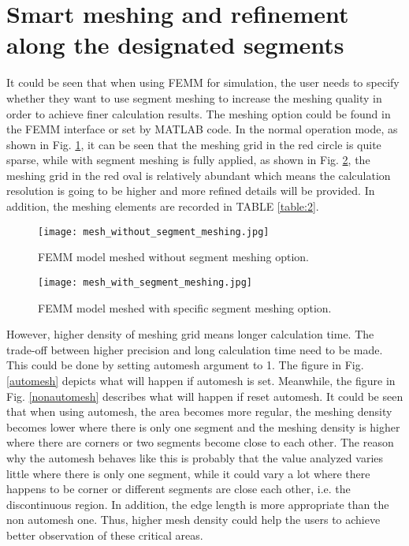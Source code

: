 \documentclass[a4paper]{IEEEtran}
\begin{document}
{\section{Smart meshing and refinement along the designated segments}
It could be seen that when using FEMM for simulation, the user needs to specify whether they want to use
segment meshing to increase the meshing quality in order to achieve finer calculation results.
The meshing option could be found in the FEMM interface or set by MATLAB code. In the normal operation mode, as shown in Fig. \ref{without meshing},
it can be seen that the meshing grid in the red circle is quite sparse, while with segment meshing is fully applied, as shown in Fig. \ref{with meshing},
the meshing grid in the red oval is relatively abundant which means the calculation resolution is going to be higher and more refined
details will be provided. In addition, the meshing elements are recorded in TABLE \ref{table:2}.
\begin{figure}[H]
\begin{centering}
\texttt{[image: mesh\_without\_segment\_meshing.jpg]} 
\par\end{centering}   
\caption{FEMM model meshed without segment meshing option.\label{without meshing}}
\end{figure} 

\begin{figure}[!ht]
\begin{centering}
\texttt{[image: mesh\_with\_segment\_meshing.jpg]} 
\par\end{centering}   
\caption{FEMM model meshed with specific segment meshing option.\label{with meshing}}
\end{figure} 

However, higher density of meshing grid means longer calculation time. The trade-off between higher precision and long calculation time 
need to be made. This could be done by setting automesh argument to 1. The figure in Fig. \ref{automesh} depicts what will happen if automesh is set. Meanwhile, the figure in Fig. \ref{nonautomesh}
describes what will happen if reset automesh.
It could be seen that when using automesh, the area becomes more regular, the meshing density becomes lower where there is only one segment and the meshing density is 
higher where there are corners or two segments become close to each other. The reason why the automesh behaves like this is probably that the value analyzed varies
little where there is only one segment, while it could vary a lot where there happens to be corner or different segments are close each other, i.e. the 
discontinuous region. In addition, the edge length is more appropriate than the non automesh one. 
Thus, higher mesh density could help the users to achieve better observation of these critical areas.

}
\end{document}

